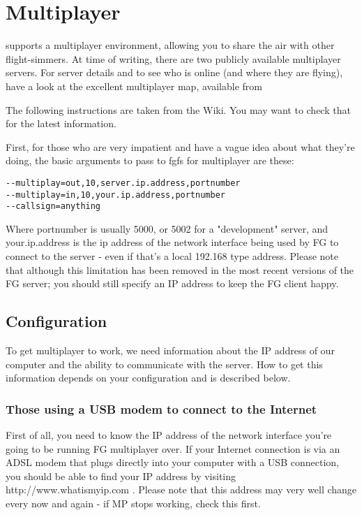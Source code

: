 \section{Multiplayer}

\FlightGear{} supports a multiplayer environment, allowing you to share the air with other flight-simmers. At time of writing, there are two publicly available multiplayer servers. For server details and to see who is online (and where they are flying), have a look at the excellent multiplayer map, available from

\noindent
{}

The following instructions are taken from the \FlightGear{} Wiki. You may want to check that for the latest information.

First, for those who are very impatient and have a vague idea about what they're doing, the basic arguments to pass to fgfs for multiplayer are these:

\begin{verbatim}
--multiplay=out,10,server.ip.address,portnumber
--multiplay=in,10,your.ip.address,portnumber
--callsign=anything 
\end{verbatim}

Where portnumber is usually 5000, or 5002 for a "development" server, and your.ip.address is the ip address of the network interface being used by FG to connect to the server - even if that's a local 192.168 type address.  Please note that although this limitation has been removed in the most recent versions of the FG server; you should still specify an IP address to keep the FG client happy.

\subsection{Configuration}

To get multiplayer to work, we need information about the IP address of our computer and the ability to communicate with the server. How to get this information depends on your configuration and is described below.


\subsubsection{Those using a USB modem to connect to the Internet}

First of all, you need to know the IP address of the network interface you're going to be running FG multiplayer over. If your Internet connection is via an ADSL modem that plugs directly into your computer with a USB connection, you should be able to find your IP address by visiting http://www.whatismyip.com . Please note that this address may very well change every now and again - if MP stops working, check this first.


